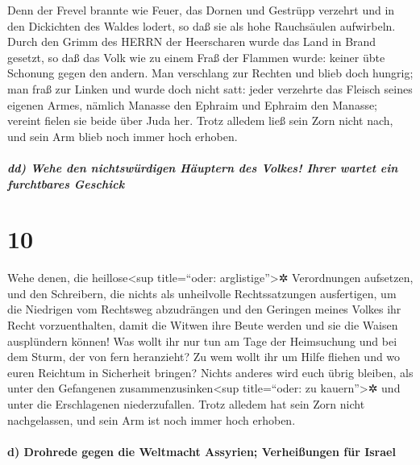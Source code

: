 Denn der Frevel brannte wie Feuer, das Dornen und
Gestrüpp verzehrt und in den Dickichten des Waldes lodert, so daß sie
als hohe Rauchsäulen aufwirbeln. Durch den Grimm des
HERRN der Heerscharen wurde das Land in Brand gesetzt, so daß das Volk
wie zu einem Fraß der Flammen wurde: keiner übte Schonung gegen den
andern. Man verschlang zur Rechten und blieb doch
hungrig; man fraß zur Linken und wurde doch nicht satt: jeder verzehrte
das Fleisch seines eigenen Armes, nämlich Manasse den
Ephraim und Ephraim den Manasse; vereint fielen sie beide über Juda her.
Trotz alledem ließ sein Zorn nicht nach, und sein Arm blieb noch immer
hoch erhoben.

\hypertarget{dd-wehe-den-nichtswuxfcrdigen-huxe4uptern-des-volkes-ihrer-wartet-ein-furchtbares-geschick}{%
\subparagraph{dd) Wehe den nichtswürdigen Häuptern des Volkes! Ihrer
wartet ein furchtbares
Geschick}\label{dd-wehe-den-nichtswuxfcrdigen-huxe4uptern-des-volkes-ihrer-wartet-ein-furchtbares-geschick}}

\hypertarget{section-9}{%
\section{10}\label{section-9}}

Wehe denen, die heillose\textless sup title=``oder:
arglistige''\textgreater✲ Verordnungen aufsetzen, und den Schreibern,
die nichts als unheilvolle Rechtssatzungen ausfertigen, um
die Niedrigen vom Rechtsweg abzudrängen und den Geringen meines Volkes
ihr Recht vorzuenthalten, damit die Witwen ihre Beute werden und sie die
Waisen ausplündern können! Was wollt ihr nur tun am Tage
der Heimsuchung und bei dem Sturm, der von fern heranzieht? Zu wem wollt
ihr um Hilfe fliehen und wo euren Reichtum in Sicherheit bringen?
Nichts anderes wird euch übrig bleiben, als unter den
Gefangenen zusammenzusinken\textless sup title=``oder: zu
kauern''\textgreater✲ und unter die Erschlagenen niederzufallen. Trotz
alledem hat sein Zorn nicht nachgelassen, und sein Arm ist noch immer
hoch erhoben.

\hypertarget{d-drohrede-gegen-die-weltmacht-assyrien-verheiuxdfungen-fuxfcr-israel}{%
\paragraph{d) Drohrede gegen die Weltmacht Assyrien; Verheißungen für
Israel}\label{d-drohrede-gegen-die-weltmacht-assyrien-verheiuxdfungen-fuxfcr-israel}}

